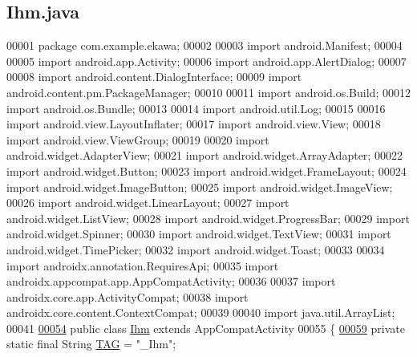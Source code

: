 \hypertarget{_ihm_8java_source}{}\subsection{Ihm.\+java}
\label{_ihm_8java_source}

\begin{DoxyCode}
00001 \textcolor{keyword}{package }com.example.ekawa;
00002 
00003 \textcolor{keyword}{import} android.Manifest;
00004 
00005 \textcolor{keyword}{import} android.app.Activity;
00006 \textcolor{keyword}{import} android.app.AlertDialog;
00007 
00008 \textcolor{keyword}{import} android.content.DialogInterface;
00009 \textcolor{keyword}{import} android.content.pm.PackageManager;
00010 
00011 \textcolor{keyword}{import} android.os.Build;
00012 \textcolor{keyword}{import} android.os.Bundle;
00013 
00014 \textcolor{keyword}{import} android.util.Log;
00015 
00016 \textcolor{keyword}{import} android.view.LayoutInflater;
00017 \textcolor{keyword}{import} android.view.View;
00018 \textcolor{keyword}{import} android.view.ViewGroup;
00019 
00020 \textcolor{keyword}{import} android.widget.AdapterView;
00021 \textcolor{keyword}{import} android.widget.ArrayAdapter;
00022 \textcolor{keyword}{import} android.widget.Button;
00023 \textcolor{keyword}{import} android.widget.FrameLayout;
00024 \textcolor{keyword}{import} android.widget.ImageButton;
00025 \textcolor{keyword}{import} android.widget.ImageView;
00026 \textcolor{keyword}{import} android.widget.LinearLayout;
00027 \textcolor{keyword}{import} android.widget.ListView;
00028 \textcolor{keyword}{import} android.widget.ProgressBar;
00029 \textcolor{keyword}{import} android.widget.Spinner;
00030 \textcolor{keyword}{import} android.widget.TextView;
00031 \textcolor{keyword}{import} android.widget.TimePicker;
00032 \textcolor{keyword}{import} android.widget.Toast;
00033 
00034 \textcolor{keyword}{import} androidx.annotation.RequiresApi;
00035 \textcolor{keyword}{import} androidx.appcompat.app.AppCompatActivity;
00036 
00037 \textcolor{keyword}{import} androidx.core.app.ActivityCompat;
00038 \textcolor{keyword}{import} androidx.core.content.ContextCompat;
00039 
00040 \textcolor{keyword}{import} java.util.ArrayList;
00041 
\hyperlink{classcom_1_1example_1_1ekawa_1_1_ihm}{00054} \textcolor{keyword}{public} \textcolor{keyword}{class }\hyperlink{classcom_1_1example_1_1ekawa_1_1_ihm}{Ihm} \textcolor{keyword}{extends} AppCompatActivity
00055 \{
\hyperlink{classcom_1_1example_1_1ekawa_1_1_ihm_a95cd92c2acaf9f8982302da08d94f9aa}{00059}     \textcolor{keyword}{private} \textcolor{keyword}{static} \textcolor{keyword}{final} String \hyperlink{classcom_1_1example_1_1ekawa_1_1_ihm_a95cd92c2acaf9f8982302da08d94f9aa}{TAG} = \textcolor{stringliteral}{"\_Ihm"};                

\end{DoxyCode}
